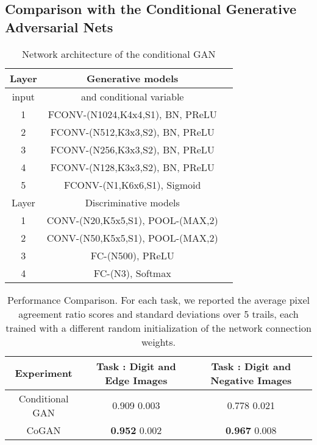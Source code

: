 \documentclass{article}
\begin{document}
\subsection{Comparison with the Conditional Generative Adversarial Nets}\label{subsec::cgan}



\begin{table}[thb!]
\small
\centering
{
\caption{Network architecture of the conditional GAN}
\label{tbl::cgan}
\begin{tabular}{|c|c|c|}
\hline\rule{0pt}{2ex}    
Layer &  Generative models \\
\hline 
input &   and conditional variable  \\
1 &  FCONV-(N1024,K4x4,S1), BN, PReLU \\
2 &  FCONV-(N512,K3x3,S2), BN, PReLU \\
3 &  FCONV-(N256,K3x3,S2), BN, PReLU \\
4 &  FCONV-(N128,K3x3,S2), BN, PReLU \\
5 &  FCONV-(N1,K6x6,S1), Sigmoid \\
\hline
\hline\rule{0pt}{2ex} 
Layer &  Discriminative models \\
\hline\rule{0pt}{2ex} 
1 & CONV-(N20,K5x5,S1), POOL-(MAX,2) \\
2 & CONV-(N50,K5x5,S1), POOL-(MAX,2) \\
3 & FC-(N500), PReLU \\
4 & FC-(N3), Softmax \\
\hline
\end{tabular}}
\end{table}

\begin{table}[thb!]
\centering
{ 
\caption{Performance Comparison. For each task, we reported the average pixel agreement ratio scores and standard deviations over 5 trails, each trained with a different random initialization of the network connection weights.}
\label{tbl::cgan_perf}
\begin{tabular}{|c|c|c|}
\hline
Experiment & Task : Digit and Edge Images & Task : Digit and Negative Images \\
\hline
Conditional GAN & 0.909  0.003 & 0.778  0.021\\
CoGAN & {\bf 0.952}  0.002 & {\bf 0.967}  0.008\\
\hline
\end{tabular}}
\end{table}
\end{document}
